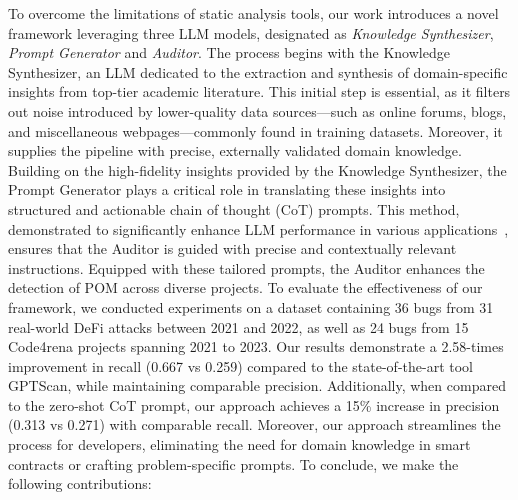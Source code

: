 To overcome the limitations of static analysis tools, our work introduces a novel framework leveraging three LLM models, designated as \textit{Knowledge Synthesizer}, \textit{Prompt Generator} and \textit{Auditor}.
The process begins with the Knowledge Synthesizer, an LLM dedicated to the extraction and synthesis of domain-specific insights from top-tier academic literature. 
This initial step is essential, as it filters out noise introduced by lower-quality data sources—such as online forums, blogs, and miscellaneous webpages—commonly found in training datasets. Moreover, it supplies the pipeline with precise, externally validated domain knowledge.
Building on the high-fidelity insights provided by the Knowledge Synthesizer, the Prompt Generator plays a critical role in translating these insights into structured and actionable chain of thought (CoT) prompts. 
This method, demonstrated to significantly enhance LLM performance in various applications~\cite{kojima2022large}, ensures that the Auditor is guided with precise and contextually relevant instructions.
Equipped with these tailored prompts, the Auditor enhances the detection of POM across diverse projects.
To evaluate the effectiveness of our framework, we conducted experiments on a dataset containing 36 bugs from 31 real-world DeFi attacks between 2021 and 2022, as well as 24 bugs from 15 Code4rena projects spanning 2021 to 2023. 
Our results demonstrate a 2.58-times improvement in recall (0.667 vs 0.259) compared to the state-of-the-art tool GPTScan, while maintaining comparable precision. 
Additionally, when compared to the zero-shot CoT prompt, our approach achieves a 15\% increase in precision (0.313 vs 0.271) with comparable recall.
Moreover, our approach streamlines the process for developers, eliminating the need for domain knowledge in smart contracts or crafting problem-specific prompts.
To conclude, we make the following contributions:
